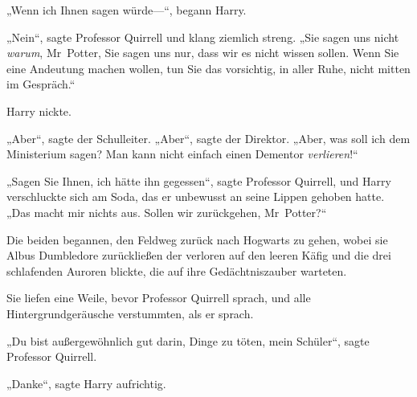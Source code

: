 „Wenn ich Ihnen sagen würde—“, begann Harry.

„Nein“, sagte Professor Quirrell und klang ziemlich streng. „Sie sagen uns nicht \emph{warum}, Mr~Potter, Sie sagen uns nur, dass wir es nicht wissen sollen. Wenn Sie eine Andeutung machen wollen, tun Sie das vorsichtig, in aller Ruhe, nicht mitten im Gespräch.“

Harry nickte.

„Aber“, sagte der Schulleiter. „Aber“, sagte der Direktor. „Aber, was soll ich dem Ministerium sagen? Man kann nicht einfach einen Dementor \emph{verlieren}!“

„Sagen Sie Ihnen, ich hätte ihn gegessen“, sagte Professor Quirrell, und Harry verschluckte sich am Soda, das er unbewusst an seine Lippen gehoben hatte. „Das macht mir nichts aus. Sollen wir zurückgehen, Mr~Potter?“

Die beiden begannen, den Feldweg zurück nach Hogwarts zu gehen, wobei sie Albus Dumbledore zurückließen der verloren auf den leeren Käfig und die drei schlafenden Auroren blickte, die auf ihre Gedächtniszauber warteten.


Sie liefen eine Weile, bevor Professor Quirrell sprach, und alle Hintergrundgeräusche verstummten, als er sprach.

„Du bist außergewöhnlich gut darin, Dinge zu töten, mein Schüler“, sagte Professor Quirrell.

„Danke“, sagte Harry aufrichtig.

